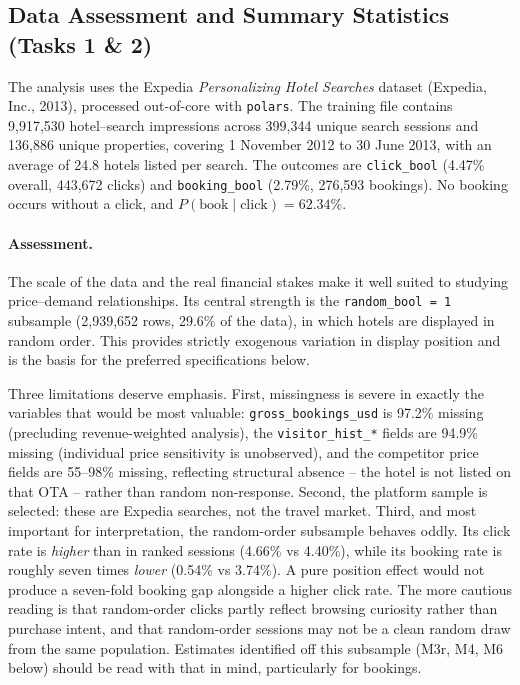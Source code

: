 \documentclass[11pt]{article}
\newcommand{\code}[1]{\texttt{\small #1}}
\begin{document}
\subsection{Data Assessment and Summary Statistics (Tasks 1 \& 2)}

The analysis uses the Expedia \emph{Personalizing Hotel Searches} dataset
(Expedia, Inc., 2013), processed out-of-core with \code{polars}. The training
file contains 9,917,530 hotel--search impressions across 399,344 unique search
sessions and 136,886 unique properties, covering 1 November 2012 to 30 June
2013, with an average of 24.8 hotels listed per search. The outcomes are
\code{click\_bool} (4.47\% overall, 443,672 clicks) and \code{booking\_bool}
(2.79\%, 276,593 bookings). No booking occurs without a click, and
$P(\text{book} \mid \text{click}) = 62.34\%$.

\paragraph{Assessment.} The scale of the data and the real financial stakes
make it well suited to studying price--demand relationships. Its central
strength is the \code{random\_bool = 1} subsample (2,939,652 rows, 29.6\% of
the data), in which hotels are displayed in random order. This provides
strictly exogenous variation in display position and is the basis for the
preferred specifications below.

Three limitations deserve emphasis. First, missingness is severe in exactly
the variables that would be most valuable: \code{gross\_bookings\_usd} is
97.2\% missing (precluding revenue-weighted analysis), the
\code{visitor\_hist\_*} fields are 94.9\% missing (individual price
sensitivity is unobserved), and the competitor price fields are 55--98\%
missing, reflecting structural absence -- the hotel is not listed on that OTA
-- rather than random non-response. Second, the platform sample is selected:
these are Expedia searches, not the travel market. Third, and most important
for interpretation, the random-order subsample behaves oddly. Its click rate
is \emph{higher} than in ranked sessions (4.66\% vs 4.40\%), while its booking
rate is roughly seven times \emph{lower} (0.54\% vs 3.74\%). A pure position
effect would not produce a seven-fold booking gap alongside a higher click
rate. The more cautious reading is that random-order clicks partly reflect
browsing curiosity rather than purchase intent, and that random-order sessions
may not be a clean random draw from the same population. Estimates identified
off this subsample (M3r, M4, M6 below) should be read with that in mind,
particularly for bookings.
\end{document}
